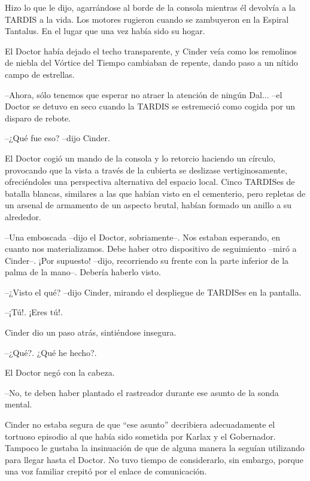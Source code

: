 Hizo lo que le dijo, agarrándose al borde de la consola mientras él devolvía a la TARDIS a la vida. Los motores rugieron cuando se zambuyeron en la Espiral Tantalus. En el lugar que una vez había sido su hogar.

El Doctor había dejado el techo transparente, y Cinder veía como los remolinos de niebla del Vórtice del Tiempo cambiaban de repente, dando paso a un nítido campo de estrellas.



--Ahora, sólo tenemos que esperar no atraer la atención de ningún Dal... --el Doctor se detuvo en seco cuando la TARDIS se estremeció como cogida por un disparo de rebote.

--¿Qué fue eso? --dijo Cinder.



El Doctor cogió un mando de la consola y lo retorcio haciendo un círculo, provocando que la vista a través de la cubierta se deslizase vertiginosamente, ofreciéndoles una perspectiva alternativa del espacio local. Cinco TARDISes de batalla blancas, similares a las que habían visto en el cementerio, pero repletas de un arsenal de armamento de un aspecto brutal, habían formado un anillo a su alrededor.



--Una emboscada --dijo el Doctor, sobriamente--. Nos estaban esperando, en cuanto nos materializamos. Debe haber otro dispositivo de seguimiento --miró a Cinder--. ¡Por supuesto! --dijo, recorriendo su frente con la parte inferior de la palma de la mano--. Debería haberlo visto.

--¿Visto el qué? --dijo Cinder, mirando el despliegue de TARDISes en la pantalla.

--¡Tú!. ¡Eres tú!.



Cinder dio un paso atrás, sintiéndose insegura. 



--¿Qué?. ¿Qué he hecho?.



El Doctor negó con la cabeza. 



--No, te deben haber plantado el rastreador durante ese asunto de la sonda mental.



Cinder no estaba segura de que ``ese asunto'' decribiera adecuadamente el tortuoso episodio al que había sido sometida por Karlax y el Gobernador. Tampoco le gustaba la insinuación de que de alguna manera la seguían utilizando para llegar hasta el Doctor. No tuvo tiempo de considerarlo, sin embargo, porque una voz familiar crepitó por el enlace de comunicación.



